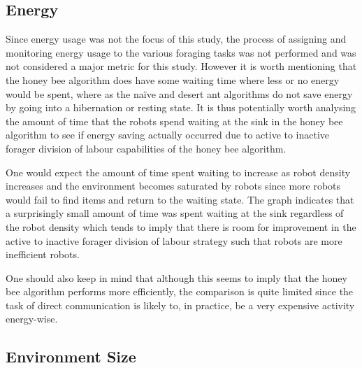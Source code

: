 
\subsection{Energy}
\label{results:energy}

Since energy usage was not the focus of this study, the process of assigning and monitoring energy usage to the various foraging tasks was not performed and was not considered a major metric for this study. However it is worth mentioning that the honey bee algorithm does have some waiting time where less or no energy would be spent, where as the na\"ive and desert ant algorithms do not save energy by going into a hibernation or resting state. It is thus potentially worth analysing the amount of time that the robots spend waiting at the sink in the honey bee algorithm to see if energy saving actually occurred due to active to inactive forager division of labour capabilities of the honey bee algorithm. 

One would expect the amount of time spent waiting to increase as robot density increases and the environment becomes saturated by robots since more robots would fail to find items and return to the waiting state. The graph indicates that a surprisingly small amount of time was spent waiting at the sink regardless of the robot density which tends to imply that there is room for improvement in the active to inactive forager division of labour strategy such that robots are more inefficient robots. 

One should also keep in mind that although this seems to imply that the honey bee algorithm performs more efficiently, the comparison is quite limited since the task of direct communication is likely to, in practice, be a very expensive activity energy-wise.

\subsection{Environment Size}
\label{results:environmentsize}




